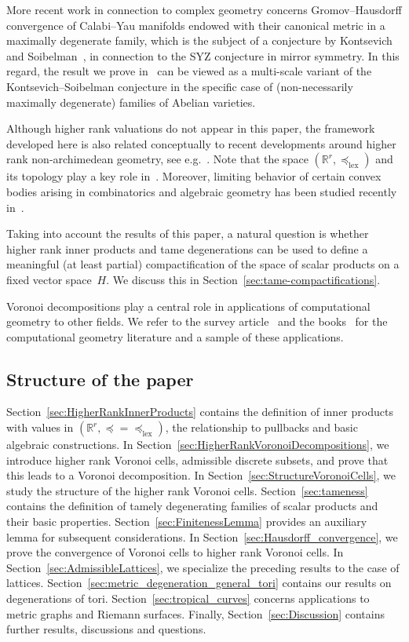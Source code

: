 \documentclass[AHL,Unicode,longabstracts]{cedram}
\newcommand{\R}{\mathbb{R}}
\newcommand{\lexeq}{\preceq_{\mathrm{lex}}}
\begin{document}
More recent work in connection to complex geometry concerns Gromov--Hausdorff convergence of Calabi--Yau manifolds endowed with their canonical metric in a maximally degenerate family, which is the subject of a conjecture by Kontsevich and Soibelman~\cite{KS}, in connection to the SYZ conjecture in mirror symmetry. In this regard, the result we prove in~\cite{AN-AG-hybrid} can be viewed as a multi-scale variant of the Kontsevich--Soibelman conjecture in the specific case of (non-necessarily maximally degenerate) families of Abelian varieties.



Although higher rank valuations do not appear in this paper, the framework developed here is also related conceptually to recent developments around higher rank non-archimedean geometry, see e.g.~\cite{Aro10, AI22, Ban15, FR16, HIL20, Iri22, JS23}. Note that the space $(\R^r, \lexeq)$ and its topology play a key role in~\cite{AI22,HIL20, Iri22}. Moreover, limiting behavior of certain convex bodies arising in combinatorics and algebraic geometry has been studied recently in~\cite{ABGJ18, ABGJ22, AI22}.


Taking into account the results of this paper, a natural question is whether higher rank inner products and tame degenerations can be used to define a meaningful (at least partial) compactification of the space of scalar products on a fixed vector space~$H$. We discuss this in Section~\ref{sec:tame-compactifications}.



Voronoi decompositions play a central role in applications of computational geometry to other fields. We refer to the survey article~\cite{Aur91} and the books~\cite{BY98, BSCO09} for the computational geometry literature and a sample of these applications.



\subsection*{Structure of the paper}

Section~\ref{sec:HigherRankInnerProducts} contains the definition of inner products with values in $(\R^r, \preceq=\lexeq)$, the relationship to pullbacks and basic algebraic constructions. In Section~\ref{sec:HigherRankVoronoiDecompositions}, we introduce higher rank Voronoi cells, admissible discrete subsets, and prove that this leads to a Voronoi decomposition. In Section~\ref{sec:StructureVoronoiCells}, we study the structure of the higher rank Voronoi cells. Section~\ref{sec:tameness} contains the definition of tamely degenerating families of scalar products and their basic properties. Section~\ref{sec:FinitenessLemma} provides an auxiliary lemma for subsequent considerations. In Section~\ref{sec:Hausdorff_convergence}, we prove the convergence of Voronoi cells to higher rank Voronoi cells. In Section~\ref{sec:AdmissibleLattices}, we specialize the preceding results to the case of lattices. Section~\ref{sec:metric_degeneration_general_tori} contains our results on degenerations of tori. Section~\ref{sec:tropical_curves} concerns applications to metric graphs and Riemann surfaces. Finally, Section~\ref{sec:Discussion} contains further results, discussions and questions.
\end{document}
